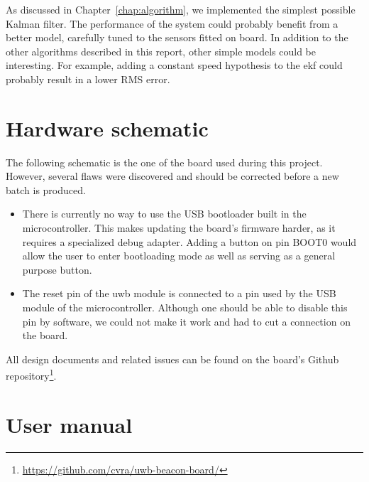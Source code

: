 \documentclass[a4paper, 12pt]{scrreprt}
\begin{document}
As discussed in Chapter~\ref{chap:algorithm}, we implemented the simplest possible Kalman filter.
The performance of the system could probably benefit from a better model, carefully tuned to the sensors fitted on board.
In addition to the other algorithms described in this report, other simple models could be interesting.
For example, adding a constant speed hypothesis to the \gls{ekf} could probably result in a lower RMS error.

\appendix
\chapter{Hardware schematic}

The following schematic is the one of the board used during this project.
However, several flaws were discovered and should be corrected before a new batch is produced.

\begin{itemize}
    \item There is currently no way to use the USB bootloader built in the microcontroller.
        This makes updating the board's firmware harder, as it requires a specialized debug adapter.
        Adding a button on pin BOOT0 would allow the user to enter bootloading mode as well as serving as a general purpose button.
    \item The reset pin of the \gls{uwb} module is connected to a pin used by the USB module of the microcontroller.
        Although one should be able to disable this pin by software, we could not make it work and had to cut a connection on the board.
\end{itemize}

All design documents and related issues can be found on the board's Github repository\footnote{\url{https://github.com/cvra/uwb-beacon-board/}}.




\chapter{User manual}


\clearpage
\nocite{*} %


\end{document}
